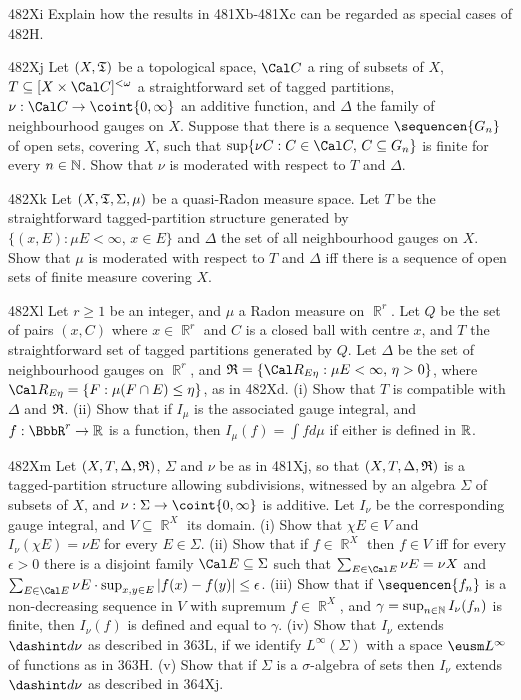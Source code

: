 {\spheader 482Xi Explain how the results in 481Xb-481Xc can be regarded
as special cases of 482H.

\spheader 482Xj Let $(X,\frak T)$ be a topological space, $\Cal C$ a
ring of subsets of $X$, $T\subseteq[X\times\Cal C]^{<\omega}$ a
straightforward set of tagged partitions,
$\nu:\Cal C\to\coint{0,\infty}$ an additive function, and $\Delta$ the
family of neighbourhood gauges on $X$.   Suppose that there is a
sequence $\sequencen{G_n}$ of open sets, covering $X$, such that
$\sup\{\nu C:C\in\Cal C,\,C\subseteq G_n\}$ is finite for every
$n\in\Bbb N$.   Show that $\nu$ is moderated with respect to $T$ and
$\Delta$.

\spheader 482Xk Let $(X,\frak T,\Sigma,\mu)$ be a quasi-Radon measure
space.   Let $T$ be the straightforward tagged-partition structure
generated by
$\{(x,E):\mu E<\infty,\,x\in E\}$ and $\Delta$ the set of all
neighbourhood gauges on $X$.   Show that $\mu$ is moderated with
respect
to $T$ and $\Delta$ iff there is a sequence of open sets of finite
measure covering $X$.

\spheader 482Xl Let $r\ge 1$ be an integer, and $\mu$ a Radon measure
on $\BbbR^r$.   Let $Q$ be the set of pairs $(x,C)$ where
$x\in\BbbR^r$ and $C$ is a closed ball with centre $x$, and $T$ the
straightforward set of tagged partitions generated by $Q$.   Let
$\Delta$ be the set of neighbourhood gauges on $\BbbR^r$, and
$\frak R=\{\Cal R_{E\eta}:\mu E<\infty,\,\eta>0\}$, where
$\Cal R_{E\eta}=\{F:\mu(F\cap E)\le\eta\}$, as in 482Xd.   (i) Show
that $T$ is compatible with $\Delta$ and $\frak R$.   
(ii) Show that if
$I_{\mu}$ is the associated gauge integral, and $f:\BbbR^r\to\Bbb R$
is a function, then $I_{\mu}(f)=\int fd\mu$ if either is defined in
$\Bbb R$.

\spheader 482Xm
Let $(X,T,\Delta,\frak R)$, $\Sigma$ and $\nu$ be as in 481Xj, so that
$(X,T,\Delta,\frak R)$ is a tagged-partition structure allowing
subdivisions, witnessed by an algebra $\Sigma$ of subsets of $X$, and
$\nu:\Sigma\to\coint{0,\infty}$ is additive.   Let $I_{\nu}$ be the
corresponding gauge integral, and $V\subseteq\BbbR^X$ its domain.   
(i) Show that $\chi E\in V$ and $I_{\nu}(\chi E)=\nu E$
for every $E\in\Sigma$.   (ii) Show that if $f\in\BbbR^X$ then $f\in V$ iff
for every $\epsilon>0$ there is a disjoint family $\Cal E\subseteq\Sigma$
such that $\sum_{E\in\Cal E}\nu E=\nu X$ and
$\sum_{E\in\Cal E}\nu E\cdot\sup_{x,y\in E}|f(x)-f(y)|\le\epsilon$.
(iii) Show that if
$\sequencen{f_n}$ is a non-decreasing sequence in $V$ with supremum 
$f\in\BbbR^X$, and $\gamma=\sup_{n\in\Bbb N}I_{\nu}(f_n)$ is finite, then
$I_{\nu}(f)$ is defined and equal to $\gamma$.
(iv) Show that $I_{\nu}$ extends $\dashint d\nu$ as described in
363L, if we identify $L^{\infty}(\Sigma)$ with a space $\eusm L^{\infty}$
of functions as in 363H.   (v) Show that if $\Sigma$ is a $\sigma$-algebra
of sets then $I_{\nu}$ extends $\dashint d\nu$ as described in
364Xj.


}
